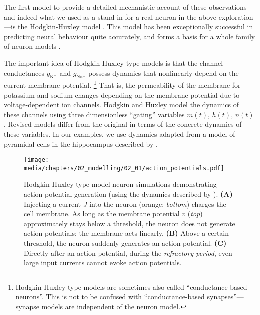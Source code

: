 \vspace*{-0.25em}
The first model to provide a detailed mechanistic account of these observations---and indeed what we used as a stand-in for a real neuron in the above exploration---is the Hodgkin-Huxley model \citep{hodgkin1952quantitative}.
This model has been exceptionally successful in predicting neural behaviour quite accurately, and forms a basis for a whole family of neuron models \citep{meunier2002playing,mccormick2007hodgkin}.

The important idea of Hodgkin-Huxley-type models is that the channel conductances $g_\mathrm{K^+}$ and $g_\mathrm{Na^+}$ possess dynamics that nonlinearly depend on the current membrane potential.%
\footnote{Hodgkin-Huxley-type models are sometimes also called \enquote{conductance-based neurons}. This is not to be confused with \enquote{conductance-based synapses}---synapse models are independent of the neuron model.}
That is, the permeability of the membrane for potassium and sodium changes depending on the membrane potential due to voltage-dependent ion channels.
Hodgkin and Huxley model the dynamics of these channels using three dimensionless \enquote{gating} variables $m(t)$, $h(t)$, $n(t)$.
Revised models differ from the original in terms of the concrete dynamics of these variables.
In our examples, we use dynamics adapted from a model of pyramidal cells in the hippocampus described by \citet[Chapter~4, pp.~92-94; ]{traub1991neuronal}.

\begin{figure}[p]
	\texttt{[image: media/chapters/02\_modelling/02\_01/action\_potentials.pdf]}
	{\label{fig:action_potentials_subthreshold}}
	{\label{fig:action_potentials_superthreshold}}
	{\label{fig:action_potentials_refractory}}
	\caption[Hodgkin-Huxley-type model neuron simulations demonstrating action potential generation]{Hodgkin-Huxley-type model neuron simulations demonstrating action potential generation (using the dynamics described by \cite{traub1991neuronal}).
	\textbf{(A)} Injecting a current $J$ into the neuron (orange; \emph{bottom}) charges the cell membrane. As long as the membrane potential $v$ (\emph{top}) approximately stays below a threshold, the neuron does not generate action potentials; the membrane acts linearly. \textbf{(B)} Above a certain threshold, the neuron suddenly generates an action potential. \textbf{(C)} Directly after an action potential, during the \emph{refractory period}, even large input currents cannot evoke action potentials.}
\end{figure}

